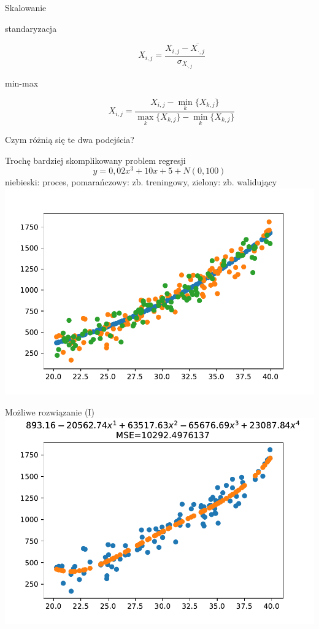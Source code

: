 \documentclass{sa}
\begin{document}
\begin{frame}{Skalowanie}
\begin{description}
\item[standaryzacja] \[ X_{i,j} = \frac{X_{i,j}-\overline{X_{\cdot,j}}}{\sigma_{X_{\cdot,j}}} \]
\item[min-max] \[ X_{i,j} = \frac{X_{i,j}-\min_k\{X_{k,j}\}}{\max_k\{X_{k,j}\}-\min_k\{X_{k,j}\}} \]
\end{description}

\vfill
\alert{Czym różnią się te dwa podejścia?}
\end{frame}

\begin{frame}{Trochę bardziej skomplikowany problem regresji}
\[ y=0{,}02x^3+10x+5+N(0,100) \]
niebieski: proces, pomarańczowy: zb. treningowy, zielony: zb. walidujący
\centering
\includegraphics[width=.9\textwidth]{reg-2deg-with-noise.pdf}
\end{frame}

\begin{frame}{Możliwe rozwiązanie (I)}
\includegraphics[width=\textwidth]{reg-2deg-with-noise-ridge0.pdf}
\end{frame}
\end{document}

